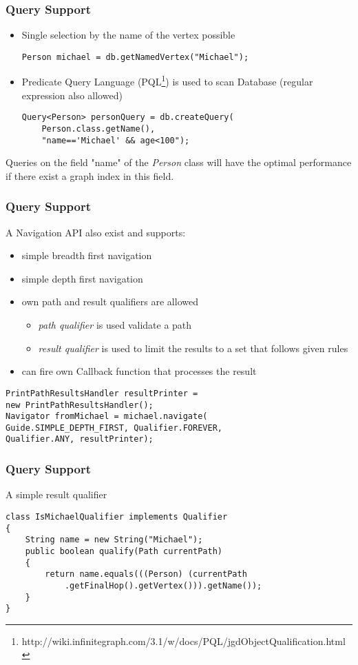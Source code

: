 
\begin{frame}[fragile]
\frametitle{Query Support}
\begin{itemize}
\item Single selection by the name of the vertex possible
\begin{lstlisting}[caption=(Point query)]
Person michael = db.getNamedVertex("Michael");
\end{lstlisting}
\item Predicate Query Language (PQL\footnote{http://wiki.infinitegraph.com/3.1/w/docs/PQL/jgdObjectQualification.html}) is used to scan Database (regular expression also allowed)
\begin{lstlisting}[caption=(Range query)]
Query<Person> personQuery = db.createQuery(
	Person.class.getName(), 
	"name=='Michael' && age<100");
\end{lstlisting}
\end{itemize}
Queries on the field "name" of the \textit{Person} class will have the optimal performance if there exist a graph index in this field. 

\end{frame} 

\begin{frame}[fragile]
\frametitle{Query Support}
A Navigation API also exist and supports:
\begin{itemize}
\item simple breadth first navigation
\item simple depth first navigation
\item own path and result qualifiers are allowed
\begin{itemize}
\item \textit{path qualifier} is used validate a path
\item \textit{result qualifier} is used to limit the results to a set that follows given rules
\end{itemize}
\item can fire own Callback function that processes the result
\end{itemize}
\begin{lstlisting}[caption=(Creating a simple Navigator)]
PrintPathResultsHandler resultPrinter = 
new PrintPathResultsHandler();
Navigator fromMichael = michael.navigate(
Guide.SIMPLE_DEPTH_FIRST, Qualifier.FOREVER, 
Qualifier.ANY, resultPrinter);
\end{lstlisting}
\end{frame} 

\begin{frame}[fragile]
\frametitle{Query Support}
A simple result qualifier 
\begin{lstlisting}[caption=(Result qualifier)]
class IsMichaelQualifier implements Qualifier
{
    String name = new String("Michael");
    public boolean qualify(Path currentPath)
    {
        return name.equals(((Person) (currentPath
            .getFinalHop().getVertex())).getName());
    }
}
\end{lstlisting}
\end{frame} 
